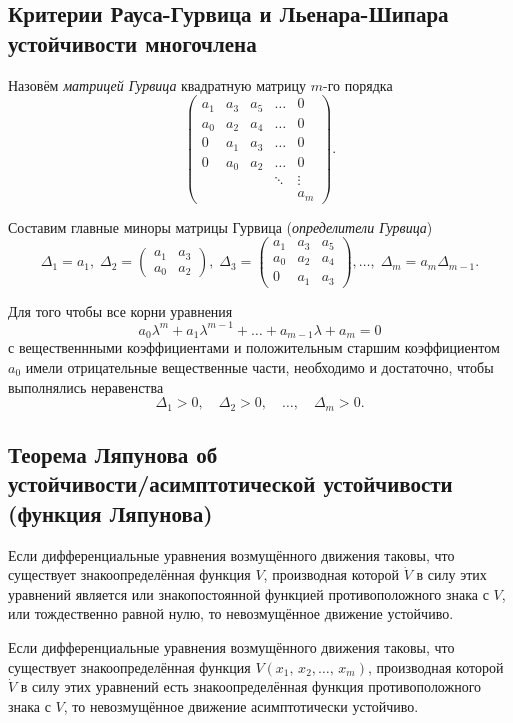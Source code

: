 \documentclass[a4paper,12pt]{article}
\begin{document}
\subsection{Критерии Рауса-Гурвица и Льенара-Шипара устойчивости многочлена}
\begin{dfn}
	 Назовём \emph{матрицей Гурвица} квадратную  матрицу $m$-го порядка
	 \[
		 \begin{pmatrix} a_1 & a_3 & a_5 & \ldots & 0\\
		 a_0 & a_2 & a_4 & \ldots & 0 \\
	 0 & a_1 & a_3 & \ldots & 0\\
 0 & a_0 & a_2 & \ldots & 0 \\
  & & & \ddots & \vdots\\
  & & & & a_m
 \end{pmatrix} 
	  .\] 
\end{dfn}
Составим главные миноры  матрицы Гурвица (\emph{определители Гурвица})
\[
	\Delta_1=a_1, \; \Delta_2 = \begin{pmatrix} a_1 & a_3 \\ a_0 & a_2 \end{pmatrix},
	\; \Delta_3= \begin{pmatrix} a_1 & a_3 & a_5 \\ a_0 & a_2 & a_4 \\
	0 & a_1 & a_3\end{pmatrix} ,\ldots,\; \Delta_m =a_m \Delta_{m-1}
.\] 
\begin{thm}
	Для того чтобы все корни уравнения
	\[
	a_0 \lambda^m+a_1 \lambda^{m-1}+\ldots+a_{m-1}\lambda+a_m=0
	\]
	с вещественнными коэффициентами и положительным старшим  коэффициентом
	$a_0$ имели отрицательные вещественные   части, необходимо и достаточно,
	чтобы выполнялись неравенства
	\[
	\Delta_1>0,\quad\Delta_2>0,\quad \ldots, \quad \Delta_m >0
	.\] 
\end{thm}
\subsection{Теорема Ляпунова об\\
	устойчивости/асимптотической устойчивости\\
(функция Ляпунова)}
\begin{thm}
	Если дифференциальные уравнения возмущённого движения таковы, что
	существует знакоопределённая функция $V$, производная которой $\dot{V}$ 
	в силу этих уравнений является  или  знакопостоянной функцией
	противоположного знака с $V$, или тождественно равной нулю, то
	невозмущённое движение устойчиво.
\end{thm}
\begin{thm}
	Если дифференциальные уравнения возмущённого движения таковы, что
	существует знакоопределённая функция $V(x_1,\,x_2,\ldots,\,x_m)$,
	производная которой $\dot{V}$  в силу этих уравнений  есть
	знакоопределённая функция противоположного знака с $V$, то
	невозмущённое движение асимптотически устойчиво.
\end{thm}
\end{document}
